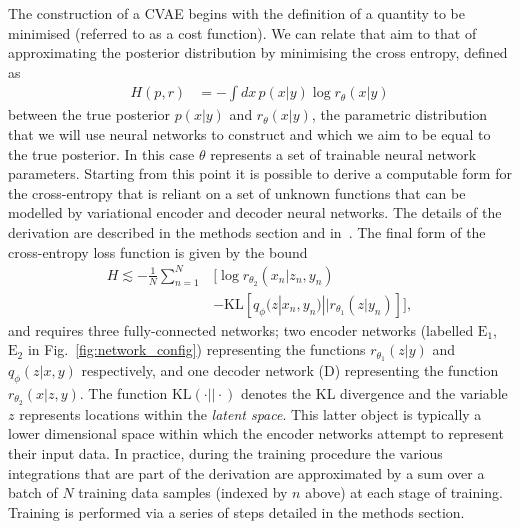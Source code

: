 %
%
The construction of a \ac{CVAE} begins with the definition of a quantity to be
minimised (referred to as a cost function). We can relate that aim to
that of approximating the posterior distribution by minimising the cross
entropy, defined as
%
\begin{align}\label{eq:cross_ent} 
H(p,r) &= -\int dx\, p(x|y) \log r_{\theta}(x|y) 
\end{align}
%
between the true posterior $p(x|y)$ and $r_{\theta}(x|y)$, the parametric
distribution that we will use neural networks to construct and which we aim to
be equal to the true posterior. In this case $\theta$ represents a set of
trainable neural network parameters. Starting from this point it is possible to
derive a computable form for the cross-entropy that is reliant on a set of
unknown functions that can be modelled by variational encoder
and decoder neural networks. The details of the derivation are described in
the methods section and in~\cite{1904.06264}. The final form of the
cross-entropy loss function is given by the bound
%
\begin{align}\label{eq:cost3}
H \lesssim -\frac{1}{N}\sum_{n=1}^{N}&\Big[\log
r_{\theta_{2}}(x_{n}|z_{n},y_{n})\nonumber\\
&-\text{KL}\left[q_{\phi}(z|x_{n},y_{n})||r_{\theta_{1}}(z|y_{n})\right]\Big],
\end{align}
%
and requires three fully-connected networks; two encoder networks (labelled
$\textrm{E}_1$, $\textrm{E}_2$ in Fig.~\ref{fig:network_config}) representing
the functions $r_{\theta_{1}}(z|y)$ and $q_{\phi}(z|x,y)$ respectively, and one
decoder network (D) representing the function $r_{\theta_{2}}(x|z,y)$. The
function $\text{KL}(\cdot||\cdot)$ denotes the \ac{KL} divergence and
the variable $z$ represents locations within the \emph{latent space}.  This
latter object is typically a lower dimensional space within which the encoder
networks attempt to represent their input data. In practice, during the
training procedure the various integrations that are part of the derivation are
approximated by a sum over a batch of $N$ training data samples (indexed by $n$
above) at each stage of training. Training is performed via a series of steps
detailed in the methods section.

